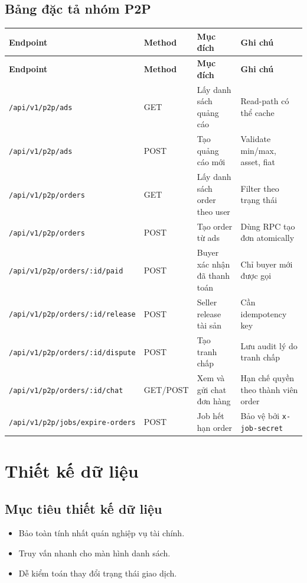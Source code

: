 \documentclass[a4paper,12pt]{report}
\begin{document}
\section{Bảng đặc tả nhóm P2P}
\begin{longtable}{|p{3.8cm}|p{1.8cm}|p{4.6cm}|p{4.4cm}|}
\hline
\textbf{Endpoint} & \textbf{Method} & \textbf{Mục đích} & \textbf{Ghi chú} \\
\hline
\endfirsthead
\hline
\textbf{Endpoint} & \textbf{Method} & \textbf{Mục đích} & \textbf{Ghi chú} \\
\hline
\endhead
\texttt{/api/v1/p2p/ads} & GET & Lấy danh sách quảng cáo & Read-path có thể cache \\
\hline
\texttt{/api/v1/p2p/ads} & POST & Tạo quảng cáo mới & Validate min/max, asset, fiat \\
\hline
\texttt{/api/v1/p2p/orders} & GET & Lấy danh sách order theo user & Filter theo trạng thái \\
\hline
\texttt{/api/v1/p2p/orders} & POST & Tạo order từ ads & Dùng RPC tạo đơn atomically \\
\hline
\texttt{/api/v1/p2p/orders/:id/paid} & POST & Buyer xác nhận đã thanh toán & Chỉ buyer mới được gọi \\
\hline
\texttt{/api/v1/p2p/orders/:id/release} & POST & Seller release tài sản & Cần idempotency key \\
\hline
\texttt{/api/v1/p2p/orders/:id/dispute} & POST & Tạo tranh chấp & Lưu audit lý do tranh chấp \\
\hline
\texttt{/api/v1/p2p/orders/:id/chat} & GET/POST & Xem và gửi chat đơn hàng & Hạn chế quyền theo thành viên order \\
\hline
\texttt{/api/v1/p2p/jobs/expire-orders} & POST & Job hết hạn order & Bảo vệ bởi \texttt{x-job-secret} \\
\hline
\end{longtable}

\chapter{Thiết kế dữ liệu}

\section{Mục tiêu thiết kế dữ liệu}
\begin{itemize}
    \item Bảo toàn tính nhất quán nghiệp vụ tài chính.
    \item Truy vấn nhanh cho màn hình danh sách.
    \item Dễ kiểm toán thay đổi trạng thái giao dịch.
\end{itemize}
\end{document}
